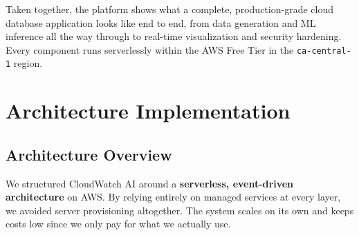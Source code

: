\documentclass[11pt,a4paper]{article}
\begin{document}
Taken together, the platform shows what a complete, production-grade cloud database application looks like end to end, from data generation and ML inference all the way through to real-time visualization and security hardening. Every component runs serverlessly within the AWS Free Tier in the \texttt{ca-central-1} region.

\section{Architecture Implementation}

\subsection{Architecture Overview}

We structured CloudWatch AI around a \textbf{serverless, event-driven architecture} on AWS. By relying entirely on managed services at every layer, we avoided server provisioning altogether. The system scales on its own and keeps costs low since we only pay for what we actually use.
\end{document}
